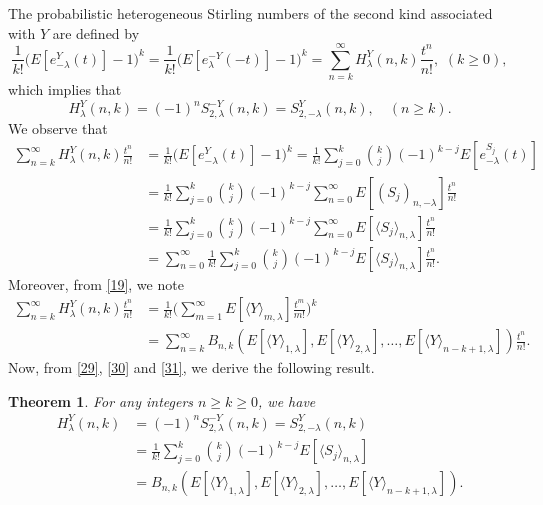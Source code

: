 \documentclass[a4paper,11pt]{amsart}
\newtheorem{theorem}{Theorem}[section]
\begin{document}
The probabilistic heterogeneous Stirling numbers of the second kind associated with $Y$ are defined by
\begin{equation} \label{28}
\frac{1}{k!}\Big(E[e_{-\lambda}^{Y}(t)]-1\Big)^{k}=\frac{1}{k!}\Big(E[e_{\lambda}^{-Y}(-t)]-1\Big)^{k}=\sum_{n=k}^{\infty}H_{\lambda}^{Y}(n,k) \frac{t^{n}}{n!}, \,\,(k \ge 0),
\end{equation}
which implies that
\begin{equation} \label{29}
H_{\lambda}^{Y}(n,k)=(-1)^{n}S_{2,\lambda}^{-Y}(n,k)=S_{2,-\lambda}^{Y}(n,k), \quad (n \ge k).
\end{equation}
We observe that
\begin{equation} \label{30}
\begin{aligned}
\sum_{n=k}^{\infty}H_{\lambda}^{Y}(n,k) \frac{t^{n}}{n!}&=\frac{1}{k!}\Big(E[e_{-\lambda}^{Y}(t)]-1\Big)^{k}
=\frac{1}{k!}\sum_{j=0}^{k}\binom{k}{j}(-1)^{k-j}E[e_{-\lambda}^{S_{j}}(t)] \\
&=\frac{1}{k!}\sum_{j=0}^{k}\binom{k}{j}(-1)^{k-j}\sum_{n=0}^{\infty}E[(S_{j})_{n,-\lambda}]\frac{t^{n}}{n!} \\
&=\frac{1}{k!}\sum_{j=0}^{k}\binom{k}{j}(-1)^{k-j}\sum_{n=0}^{\infty}E[\langle S_{j}\rangle_{n,\lambda}]\frac{t^{n}}{n!} \\
&=\sum_{n=0}^{\infty}\frac{1}{k!}\sum_{j=0}^{k}\binom{k}{j}(-1)^{k-j}E[\langle S_{j}\rangle_{n,\lambda}]\frac{t^{n}}{n!}.
\end{aligned}
\end{equation}
Moreover, from \eqref{19}, we note
\begin{equation} \label{31}
\begin{aligned}
\sum_{n=k}^{\infty}H_{\lambda}^{Y}(n,k) \frac{t^{n}}{n!}&=\frac{1}{k!}\bigg(\sum_{m=1}^{\infty}E[\langle Y \rangle_{m,\lambda}]\frac{t^{m}}{m!}\bigg)^{k} \\
&=\sum_{n=k}^{\infty}B_{n,k}(E[\langle Y \rangle_{1,\lambda}],E[\langle Y \rangle_{2,\lambda}],\dots, E[\langle Y \rangle_{n-k+1,\lambda}])\frac{t^{n}}{n!}.
\end{aligned}
\end{equation}
Now, from \eqref{29}, \eqref{30} and \eqref{31}, we derive the following result.
\begin{theorem}
For any integers $n \ge k \ge 0$, we have
\begin{align*}
H_{\lambda}^{Y}(n,k)&=(-1)^{n}S_{2,\lambda}^{-Y}(n,k)=S_{2,-\lambda}^{Y}(n,k)\\
&=\frac{1}{k!}\sum_{j=0}^{k}\binom{k}{j}(-1)^{k-j}E[\langle S_{j}\rangle_{n,\lambda}] \\
&=B_{n,k}(E[\langle Y \rangle_{1,\lambda}],E[\langle Y \rangle_{2,\lambda}],\dots, E[\langle Y \rangle_{n-k+1,\lambda}]).
\end{align*}
\end{theorem}
\end{document}
